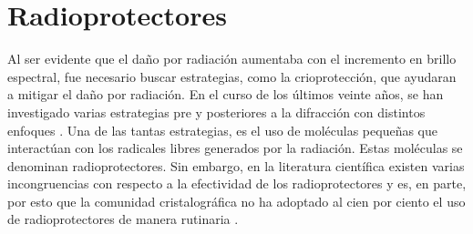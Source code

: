 \section{Radioprotectores}
Al ser evidente que el daño por radiación aumentaba con el incremento en brillo espectral, fue necesario buscar estrategias, como la crioprotección, que ayudaran a mitigar el daño por radiación. En el curso de los últimos veinte años, se han investigado varias estrategias pre y posteriores a la difracción con distintos enfoques . Una de las tantas estrategias, es el uso de moléculas pequeñas que interactúan con los radicales libres generados por la radiación. Estas moléculas se denominan radioprotectores. Sin embargo, en la literatura científica existen varias incongruencias con respecto a la efectividad de los radioprotectores y es, en parte, por esto que la comunidad cristalográfica no ha adoptado al cien por ciento el uso de radioprotectores de manera rutinaria .
